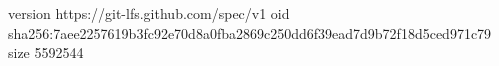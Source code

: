 version https://git-lfs.github.com/spec/v1
oid sha256:7aee2257619b3fc92e70d8a0fba2869c250dd6f39ead7d9b72f18d5ced971c79
size 5592544

